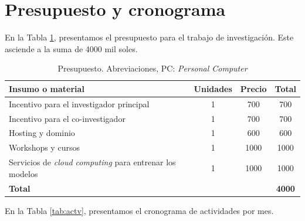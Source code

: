 \documentclass[a4paper]{article}
\begin{document}
\section{Presupuesto y cronograma}

En la Tabla \ref{tab:presupuesto}, presentamos el presupuesto para el trabajo de investigación. Este asciende a la suma de 4000 mil soles.

\begin{table}[H]
	\centering
	\setlength{\tabcolsep}{0.5em} %
	{\renewcommand{\arraystretch}{1.2}%
		\caption{Presupuesto. Abreviaciones, PC: \textit{Personal Computer}}
		\label{tab:presupuesto}
		\begin{tabular}{|p{8cm}|c|c|c|} \hline
			\textbf{Insumo o material}    & \textbf{Unidades} & \textbf{Precio} & \textbf{Total} \\ \hline
			Incentivo para el investigador principal          & 1                 & 700            & 700           \\
			Incentivo para el co-investigador & 1                 & 700            & 700           \\
			Hosting y dominio                      & 1                 & 600            & 600           \\
			Workshops y cursos       & 1                 & 1000            & 1000           \\
			Servicios de \textit{cloud computing} para entrenar los modelos       & 1                 & 1000            & 1000           \\
			 \hline
			\textbf{Total}                         &                   &                 & \textbf{4000}         \\ \hline
		\end{tabular}
	}
\end{table}


En la Tabla \ref{tab:actv}, presentamos el cronograma de actividades por mes.
\end{document}
